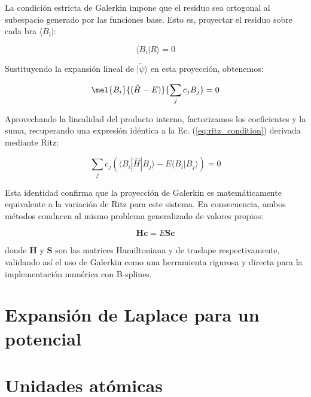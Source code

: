 La condición estricta de Galerkin impone que el residuo sea ortogonal al subespacio generado por las funciones base. Esto es, proyectar el residuo sobre cada bra \( \langle B_i| \):

\begin{equation}
    \langle B_i | R \rangle = 0
\end{equation}

Sustituyendo la expansión lineal de $|\tilde{\psi}\rangle$ en esta proyección, obtenemos:

\begin{equation}
  \mel{B_i}{(\hat{H} - E)}{\sum_jc_jB_j} = 0
\end{equation}

Aprovechando la linealidad del producto interno, factorizamos los coeficientes y la suma, recuperando una expresión idéntica a la Ec. (\cref{eq:ritz_condition}) derivada mediante Ritz:

\begin{equation}
    \sum_{j} c_j \left( \langle B_i | \hat{H} | B_j \rangle - E \langle B_i | B_j \rangle \right) = 0
\end{equation}

Esta identidad confirma que la proyección de Galerkin es matemáticamente equivalente a la variación de Ritz para este sistema. En consecuencia, ambos métodos conducen al mismo problema generalizado de valores propios:

\begin{equation}
    \mathbf{H}\mathbf{c} = E \mathbf{S}\mathbf{c}
\end{equation}

donde $\mathbf{H}$ y $\mathbf{S}$ son las matrices Hamiltoniana y de traslape respectivamente, validando así el uso de Galerkin como una herramienta rigurosa y directa para la implementación numérica con B-splines.


\printbibliography[heading=bibintoc, title={Referencias Bibliográficas}]

\appendix

\chapter{Expansión de Laplace para un potencial}

\chapter{Unidades atómicas}

